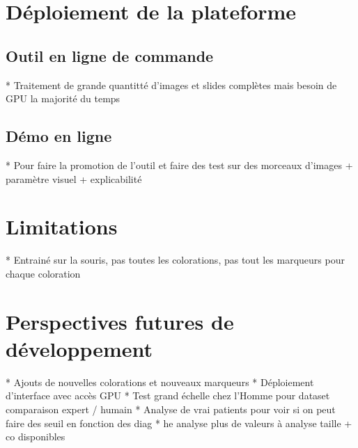 \section{Déploiement de la plateforme}
\subsection{Outil en ligne de commande}
* Traitement de grande quantitté d'images et slides complètes mais besoin de GPU la majorité du temps
\subsection{Démo en ligne}
* Pour faire la promotion de l'outil et faire des test sur des morceaux d'images + paramètre visuel + explicabilité
\section{Limitations}
* Entrainé sur la souris, pas toutes les colorations, pas tout les marqueurs pour chaque coloration

\section{Perspectives futures de développement}
* Ajouts de nouvelles colorations et nouveaux marqueurs
* Déploiement d'interface avec accès GPU
* Test grand échelle chez l'Homme pour dataset comparaison expert / humain
* Analyse de vrai patients pour voir si on peut faire des seuil en fonction des diag
* he analyse plus de valeurs à analyse taille + co disponibles